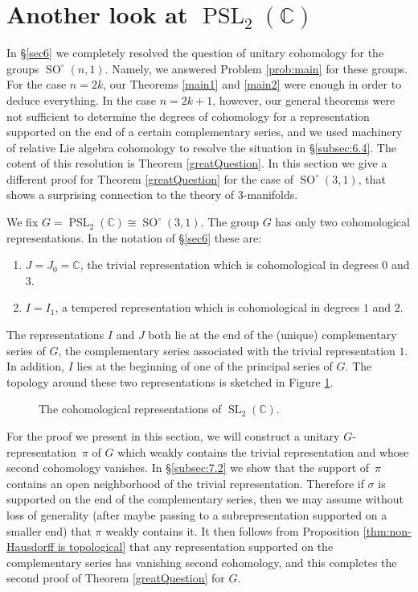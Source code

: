 \documentclass[12pt,reqno]{amsart}
\newcommand{\C}{\mathbb{C}}
\theoremstyle{definition}
\newcommand{\SL}{\operatorname{SL}}
\newcommand{\PSL}{\operatorname{PSL}}
\newcommand{\SO}{\operatorname{SO}}
\begin{document}
\section{Another look at $\PSL_2(\mathbb{C})$}\label{sec7}
In \S\ref{sec6} we completely resolved the question of unitary cohomology for the groups $\SO^\circ(n,1)$. Namely, we answered Problem \ref{prob:main} for these groups. For the case $n=2k$, our Theorems \ref{main1} and \ref{main2} were enough in order to deduce everything. In the case $n=2k+1$, however, our general theorems were not sufficient to determine the degrees of cohomology for a representation supported on the end of a certain complementary series, and we used machinery of relative Lie algebra cohomology to resolve the situation in \S\ref{subsec:6.4}. The cotent of this resolution is Theorem \ref{greatQuestion}. In this section we give a different proof for Theorem \ref{greatQuestion} for the case of $\SO^\circ(3,1)$, that shows a surprising connection to the theory of $3$-manifolds.

We fix $G=\PSL_2(\C)\cong\SO^\circ(3,1)$. The group $G$ has only two cohomological representations. In the notation of \S\ref{sec6} these are:
\begin{enumerate}
    \item $J = J_0 = \C$, the trivial representation which is cohomological in degrees $0$ and $3$.
    \item $I = I_1$, a tempered representation which is cohomological in degrees $1$ and $2$.
\end{enumerate}
The representations $I$ and $J$ both lie at the end of the (unique) complementary series of $G$, the complementary series associated with the trivial representation $1$. In addition, $I$ lies at the beginning of one of the principal series of $G$. The topology around these two representations is sketched in Figure \ref{fig:cohom_reps_SL2C}.
\begin{figure}[htbp]
    \centering
    \caption{The cohomological representations of $\SL_2(\mathbb{C})$.}
    \label{fig:cohom_reps_SL2C}
\end{figure}
For the proof we present in this section, we will construct a unitary $G$-representation~$\pi$ of $G$ which weakly contains the trivial representation and whose second cohomology vanishes. In \S\ref{subsec:7.2} we show that the support of~$\pi$ contains an open neighborhood of the trivial representation. Therefore if $\sigma$ is supported on the end of the complementary series, then we may assume without loss of generality (after maybe passing to a subrepresentation supported on a smaller end) that $\pi$ weakly contains it. It then follows from Proposition \ref{thm:non-Hausdorff is topological} that any representation supported on the complementary series has vanishing second cohomology, and this completes the second proof of Theorem \ref{greatQuestion} for $G$.
\end{document}
